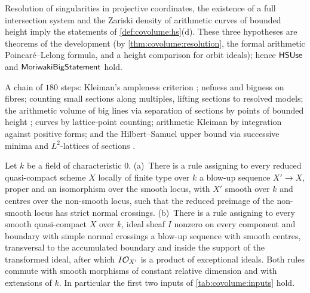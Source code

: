 \begin{theorem}\Fmark\label{thm:covolume:hs}
Resolution of singularities in projective coordinates, the existence of a full intersection system and
the Zariski density of arithmetic curves of bounded height imply the statements of
\cref{def:covolume:hs}(d). These three hypotheses are theorems of the development (by
\cref{thm:covolume:resolution}, the formal arithmetic Poincar\'e--Lelong formula, and a height comparison
for orbit ideals); hence $\mathsf{HSUse}$ and $\mathsf{MoriwakiBigStatement}$ hold.
\end{theorem}

\begin{proofoutline}
A chain of $180$ steps: Kleiman's ampleness criterion \cite{Kleiman1966}; nefness and bigness on fibres;
counting small sections along multiples, lifting sections to resolved models; the arithmetic volume of
big lines via separation of sections by points of bounded height \cite{Moriwaki2009,Yuan2008}; curves by
lattice-point counting; arithmetic Kleiman by integration against positive forms; and the
Hilbert--Samuel upper bound via successive minima and $L^2$-lattices of sections
\cite{GilletSoule1992,AbbesBouche1995,Zhang1995}.
\end{proofoutline}

\begin{theorem}\Fmark\label{thm:covolume:resolution}
Let $k$ be a field of characteristic $0$. (a)~There is a rule assigning to every reduced quasi-compact
scheme $X$ locally of finite type over $k$ a blow-up sequence $X'\to X$, proper and an isomorphism over
the smooth locus, with $X'$ smooth over $k$ and centres over the non-smooth locus, such that the
reduced preimage of the non-smooth locus has strict normal crossings. (b)~There is a rule assigning to
every smooth quasi-compact $X$ over $k$, ideal sheaf $I$ nonzero on every component and boundary with
simple normal crossings a blow-up sequence with smooth centres, transversal to the accumulated boundary
and inside the support of the transformed ideal, after which $I\mathcal{O}_{X'}$ is a product of exceptional
ideals. Both rules commute with smooth morphisms of constant relative dimension and with extensions of
$k$. In particular the first two inputs of \cref{tab:covolume:inputs} hold.
\end{theorem}

